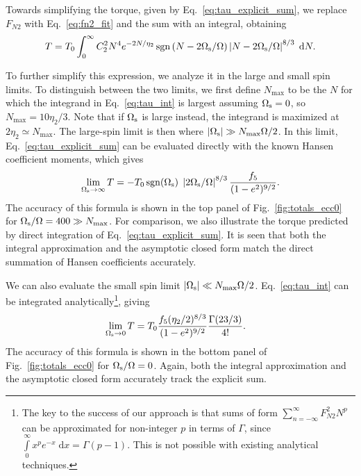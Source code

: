 \documentclass[
        fleqn,
        usenatbib,
    ]{mnras}
\newcommand*{\abs}[1]{\left|#1\right|}
\DeclareMathOperator*{\sgn}{sgn}
\begin{document}
Towards simplifying the torque, given by Eq.~\eqref{eq:tau_explicit_sum}, we
replace $F_{N2}$ with Eq.~\eqref{eq:fn2_fit} and the sum with an integral,
obtaining
\begin{equation}
    T = T_0 \int_0^\infty C_2^2 N^4 e^{-2N / \eta_2}
        \sgn\left(N - 2\Omega_{\rm s} / \Omega\right) \left|N - 2 \Omega_{\rm s} /
            \Omega\right|^{8/3}\;\mathrm{d}N.\label{eq:tau_int}
\end{equation}

To further simplify this expression, we analyze it in the large and small spin
limits. To distinguish between the two limits, we first define $N_{\max}$ to be
the $N$ for which the integrand in Eq.~\eqref{eq:tau_int} is largest assuming
$\Omega_{\rm s} = 0$, so $N_{\max} = 10\eta_2/3$. Note that if $\Omega_{\rm s}$
is large instead, the integrand is maximized at $2\eta_2 \simeq N_{\max}$.
The large-spin limit is then where $\abs{\Omega_{\rm s}} \gg N_{\max}\Omega / 2$.
In this limit, Eq.~\eqref{eq:tau_explicit_sum} can be evaluated directly with
the known Hansen coefficient moments, which gives
\begin{equation}
    \lim_{\Omega_{\rm s} \to \infty} T = -T_0 \sgn (\Omega_{\rm s})\;\left|2
        \Omega_{\rm s} / \Omega\right|^{8/3} \frac{f_5}{(1 -
        e^2)^{9/2}}.\label{eq:tau_highspin}
\end{equation}
The accuracy of this formula is shown in the top panel of
Fig.~\ref{fig:totals_ecc0} for $\Omega_{\rm s} / \Omega = 400 \gg N_{\max}$. For
comparison, we also illustrate the torque predicted by direct integration of
Eq.~\eqref{eq:tau_explicit_sum}. It is seen that both the integral approximation
and the asymptotic closed form match the direct summation of Hansen coefficients
accurately.

We can also evaluate the small spin limit $\abs{\Omega_{\rm s}} \ll
N_{\max}\Omega / 2$. Eq.~\eqref{eq:tau_int} can be integrated
analytically\footnote{The key to the success of our approach is that sums of
form $\sum_{n = -\infty}^\infty F_{N2}^2 N^p$ can be approximated for
non-integer $p$ in terms of $\Gamma$, since $\int\limits_0^\infty
x^pe^{-x}\;\mathrm{d}x = \Gamma(p - 1)$. This is not possible with existing
analytical techniques.}, giving
\begin{align}
    \lim_{\Omega_{\rm s} \to 0} T &= T_0 \frac{f_5 (\eta_2/2)^{8/3}}{(1 -
        e^2)^{9/2}} \frac{\Gamma(23/3)}{4!}.\label{eq:tau_lowspin}
\end{align}
The accuracy of this formula is shown in the bottom panel of
Fig.~\ref{fig:totals_ecc0} for $\Omega_{\rm s} / \Omega = 0$. Again, both the
integral approximation and the asymptotic closed form accurately track the
explicit sum.
\end{document}
